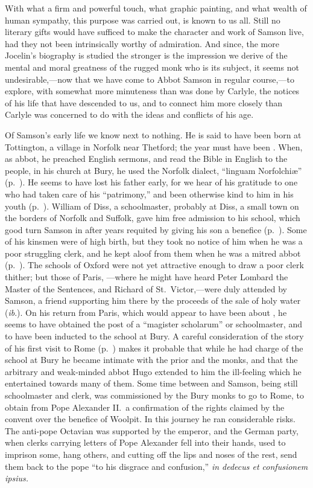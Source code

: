 \documentclass[10pt]{book}
\begin{document}
{With what a firm and powerful touch, what graphic painting, and what wealth of human sympathy, this purpose was carried out, is known to us all. Still no literary gifts would have sufficed to make the character and work of Samson live, had they not been intrinsically worthy of admiration. And since, the more Jocelin's biography is studied the stronger is the impression we derive of the mental and moral greatness of the rugged monk who is its subject, it seems not undesirable,---now that we have come to Abbot Samson in regular course,---to explore, with somewhat more minuteness than was done by Carlyle, the notices of his life that have descended to us, and to connect him more closely than Carlyle was concerned to do with the ideas and conflicts of his age.

Of Samson's early life we know next to nothing. He is said to have been born at Tottington, a village in Norfolk near Thetford; the year must have been . When, as abbot, he preached English sermons, and read the Bible in English to the people, in his church at Bury, he used the Norfolk dialect, ``linguam Norfolchi\ae{}'' (p.\ ). He seems to have lost his father early, for we hear of his gratitude to one who had taken care of his ``patrimony,'' and been otherwise kind to him in his youth (p.\ ). William of Diss, a schoolmaster, probably at Diss, a small town on the borders of Norfolk and Suffolk, gave him free admission to his school, which good turn Samson in after years requited by giving his son a benefice (p.\ ). Some of his kinsmen were of high birth, but they took no notice of him when he was a poor struggling clerk, and he kept aloof from them when he was a mitred abbot (p.\ ). The schools of Oxford were not yet attractive enough to draw a poor clerk thither; but those of Paris, ---where he might have heard Peter Lombard the Master of the Sentences, and Richard of St.\ Victor,---were duly attended by Samson, a friend supporting him there by the proceeds of the sale of holy water (\emph{ib}.). On his return from Paris, which would appear to have been about , he seems to have obtained the post of a ``magister scholarum'' or schoolmaster, and to have been inducted to the school at Bury. A careful consideration of the story of his first visit to Rome (p.\ ) makes it probable that while he had charge of the school at Bury he became intimate with the prior and the monks, and that the arbitrary and weak-minded abbot Hugo extended to him the ill-feeling which he entertained towards many of them. Some time between  and  Samson, being still schoolmaster and clerk, was commissioned by the Bury monks to go to Rome, to obtain from Pope Alexander II.\ a confirmation of the rights claimed by the convent over the benefice of Woolpit. In this journey he ran considerable risks. The anti-pope Octavian was supported by the emperor, and the German party, when clerks carrying letters of Pope Alexander fell into their hands, used to imprison some, hang others, and cutting off the lips and noses of the rest, send them back to the pope ``to his disgrace and confusion,'' \emph{in dedecus et confusionem ipsius.} }
\end{document}
